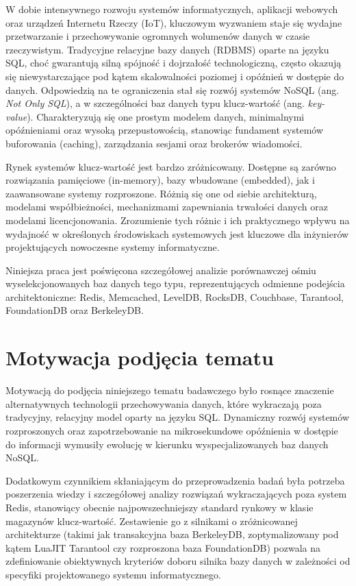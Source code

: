 W dobie intensywnego rozwoju systemów informatycznych, aplikacji webowych oraz urządzeń Internetu Rzeczy (IoT), kluczowym wyzwaniem staje się wydajne przetwarzanie i przechowywanie ogromnych wolumenów danych w czasie rzeczywistym. Tradycyjne relacyjne bazy danych (RDBMS) oparte na języku SQL, choć gwarantują silną spójność i dojrzałość technologiczną, często okazują się niewystarczające pod kątem skalowalności poziomej i opóźnień w dostępie do danych. Odpowiedzią na te ograniczenia stał się rozwój systemów NoSQL (ang. \emph{Not Only SQL}), a w szczególności baz danych typu klucz-wartość (ang. \emph{key-value}). Charakteryzują się one prostym modelem danych, minimalnymi opóźnieniami oraz wysoką przepustowością, stanowiąc fundament systemów buforowania (caching), zarządzania sesjami oraz brokerów wiadomości.

Rynek systemów klucz-wartość jest bardzo zróżnicowany. Dostępne są zarówno rozwiązania pamięciowe (in-memory), bazy wbudowane (embedded), jak i zaawansowane systemy rozproszone. Różnią się one od siebie architekturą, modelami współbieżności, mechanizmami zapewniania trwałości danych oraz modelami licencjonowania. Zrozumienie tych różnic i ich praktycznego wpływu na wydajność w określonych środowiskach systemowych jest kluczowe dla inżynierów projektujących nowoczesne systemy informatyczne.

Niniejsza praca jest poświęcona szczegółowej analizie porównawczej ośmiu wyselekcjonowanych baz danych tego typu, reprezentujących odmienne podejścia architektoniczne: Redis, Memcached, LevelDB, RocksDB, Couchbase, Tarantool, FoundationDB oraz BerkeleyDB.
\section{Motywacja podjęcia tematu}
Motywacją do podjęcia niniejszego tematu badawczego było rosnące znaczenie alternatywnych technologii przechowywania danych, które wykraczają poza tradycyjny, relacyjny model oparty na języku SQL. Dynamiczny rozwój systemów rozproszonych oraz zapotrzebowanie na mikrosekundowe opóźnienia w dostępie do informacji wymusiły ewolucję w kierunku wyspecjalizowanych baz danych NoSQL.

Dodatkowym czynnikiem skłaniającym do przeprowadzenia badań była potrzeba poszerzenia wiedzy i szczegółowej analizy rozwiązań wykraczających poza system Redis, stanowiący obecnie najpowszechniejszy standard rynkowy w klasie magazynów klucz-wartość. Zestawienie go z silnikami o zróżnicowanej architekturze (takimi jak transakcyjna baza BerkeleyDB, zoptymalizowany pod kątem LuaJIT Tarantool czy rozproszona baza FoundationDB) pozwala na zdefiniowanie obiektywnych kryteriów doboru silnika bazy danych w zależności od specyfiki projektowanego systemu informatycznego.

